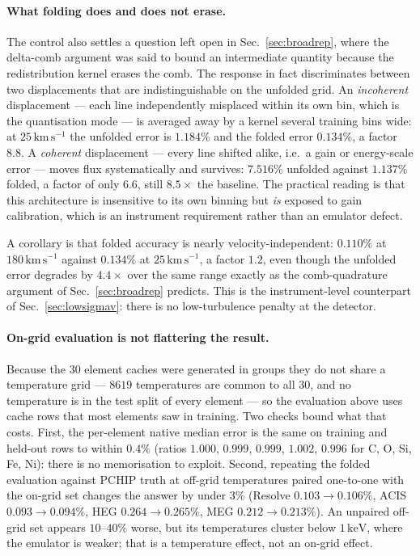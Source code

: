 \documentclass[11pt,a4paper]{article}
\newcommand{\kev}{\,\mathrm{keV}}
\newcommand{\kms}{\,\mathrm{km\,s^{-1}}}
\begin{document}
\paragraph{What folding does and does not erase.} The control also
settles a question left open in Sec.~\ref{sec:broadrep}, where the
delta-comb argument was said to bound an intermediate quantity because
the redistribution kernel erases the comb. The response in fact
discriminates between two displacements that are indistinguishable on
the unfolded grid. An \emph{incoherent} displacement --- each line
independently misplaced within its own bin, which is the quantisation
mode --- is averaged away by a kernel several training bins wide: at
$25\kms$ the unfolded error is $1.184\%$ and the folded error
$0.134\%$, a factor $8.8$. A \emph{coherent} displacement --- every
line shifted alike, i.e.\ a gain or energy-scale error --- moves flux
systematically and survives: $7.516\%$ unfolded against $1.137\%$
folded, a factor of only $6.6$, still $8.5\times$ the baseline. The
practical reading is that this architecture is insensitive to its own
binning but \emph{is} exposed to gain calibration, which is an
instrument requirement rather than an emulator defect.

A corollary is that folded accuracy is nearly velocity-independent:
$0.110\%$ at $180\kms$ against $0.134\%$ at $25\kms$, a factor $1.2$,
even though the unfolded error degrades by $4.4\times$ over the same
range exactly as the comb-quadrature argument of
Sec.~\ref{sec:broadrep} predicts. This is the instrument-level
counterpart of Sec.~\ref{sec:lowsigmav}: there is no low-turbulence
penalty at the detector.

\paragraph{On-grid evaluation is not flattering the result.} Because
the 30 element caches were generated in groups they do not share a
temperature grid --- $8619$ temperatures are common to all 30, and no
temperature is in the test split of every element --- so the
evaluation above uses cache rows that most elements saw in training.
Two checks bound what that costs. First, the per-element native median
error is the same on training and held-out rows to within $0.4\%$
(ratios $1.000$, $0.999$, $0.999$, $1.002$, $0.996$ for C, O, Si, Fe,
Ni): there is no memorisation to exploit. Second, repeating the folded
evaluation against PCHIP truth at off-grid temperatures paired
one-to-one with the on-grid set changes the answer by under $3\%$
(Resolve $0.103\to0.106\%$, ACIS $0.093\to0.094\%$, HEG
$0.264\to0.265\%$, MEG $0.212\to0.213\%$). An unpaired off-grid set
appears $10$--$40\%$ worse, but its temperatures cluster below
$1\kev$, where the emulator is weaker; that is a temperature effect,
not an on-grid effect.
\end{document}
